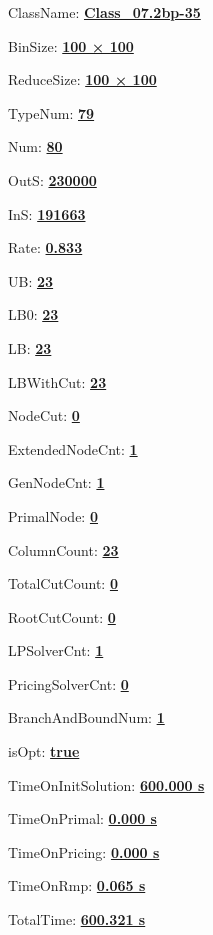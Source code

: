 \documentclass[11pt]{article}
\begin{document}
\pagestyle{empty}


ClassName: \underline{\textbf{Class_07.2bp-35}}
\par
BinSize: \underline{\textbf{100 × 100}}
\par
ReduceSize: \underline{\textbf{100 × 100}}
\par
TypeNum: \underline{\textbf{79}}
\par
Num: \underline{\textbf{80}}
\par
OutS: \underline{\textbf{230000}}
\par
InS: \underline{\textbf{191663}}
\par
Rate: \underline{\textbf{0.833}}
\par
UB: \underline{\textbf{23}}
\par
LB0: \underline{\textbf{23}}
\par
LB: \underline{\textbf{23}}
\par
LBWithCut: \underline{\textbf{23}}
\par
NodeCut: \underline{\textbf{0}}
\par
ExtendedNodeCnt: \underline{\textbf{1}}
\par
GenNodeCnt: \underline{\textbf{1}}
\par
PrimalNode: \underline{\textbf{0}}
\par
ColumnCount: \underline{\textbf{23}}
\par
TotalCutCount: \underline{\textbf{0}}
\par
RootCutCount: \underline{\textbf{0}}
\par
LPSolverCnt: \underline{\textbf{1}}
\par
PricingSolverCnt: \underline{\textbf{0}}
\par
BranchAndBoundNum: \underline{\textbf{1}}
\par
isOpt: \underline{\textbf{true}}
\par
TimeOnInitSolution: \underline{\textbf{600.000 s}}
\par
TimeOnPrimal: \underline{\textbf{0.000 s}}
\par
TimeOnPricing: \underline{\textbf{0.000 s}}
\par
TimeOnRmp: \underline{\textbf{0.065 s}}
\par
TotalTime: \underline{\textbf{600.321 s}}
\par
\newpage


\end{document}
